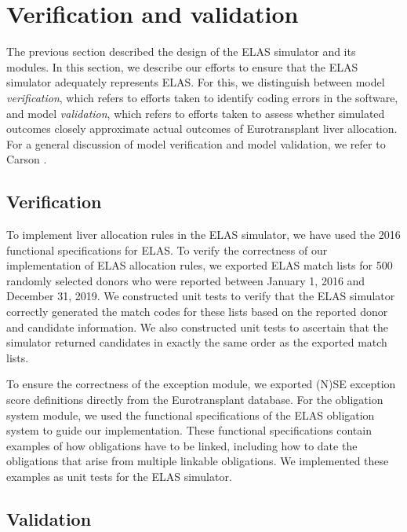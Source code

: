 \documentclass[11pt,twoside,]{book}
\begin{document}
\section{Verification and validation}\label{sec:elasvv}

The previous section described the design of the ELAS simulator and
its modules. In
this section, we describe our efforts to ensure that the ELAS simulator
adequately represents ELAS. For this, we distinguish between model
\emph{verification}, which refers to efforts taken to identify coding errors in the
software, and model \emph{validation}, which refers to efforts taken to assess whether
simulated outcomes closely approximate actual outcomes of Eurotransplant
liver allocation. For a general discussion of model verification and model
validation, we refer to Carson \citep{carsonVerificationValidationConsultants1989}.

\subsection{Verification}\label{sec:elasverification}

To implement liver allocation rules in the ELAS simulator, we have used
the 2016 functional specifications for ELAS. To verify the correctness
of our implementation of ELAS allocation rules, we exported ELAS match
lists for 500 randomly selected donors who were reported between
January 1, 2016 and December 31, 2019. We constructed unit tests to verify that
the ELAS simulator correctly generated the match codes for these lists based
on the reported donor and candidate information. We also constructed unit tests to
ascertain that the simulator returned candidates in exactly the same order as the exported match lists.

To ensure the correctness of the exception module, we exported (N)SE
exception score definitions directly from the Eurotransplant database.
For the obligation system module, we used the functional specifications of
the ELAS obligation system to guide our implementation. These functional
specifications contain examples of how obligations have to be linked, including how to date the obligations that arise from multiple linkable
obligations. We implemented these examples as unit tests for the ELAS
simulator.

\subsection{Validation}\label{sec:elasvalidation}
\end{document}
